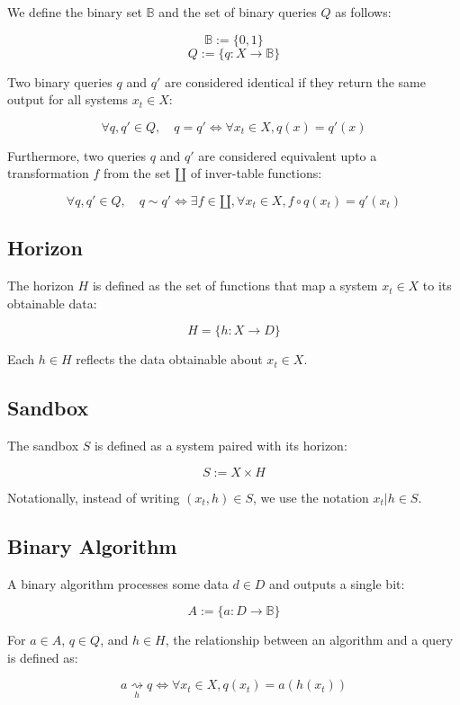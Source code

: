 \documentclass[11pt,a4paper]{article}
\theoremstyle{definition}
\theoremstyle{remark}
\numberwithin{equation}{section}
\begin{document}
We define the binary set $\mathbb{B}$ and the set of binary queries $Q$ as follows:

\[
\mathbb{B} := \{ 0, 1 \}
\]
\[
Q := \{ q : X \rightarrow \mathbb{B} \}
\]

Two binary queries $q$ and $q'$ are considered identical if they return the same output for all systems $x_t \in X$:

\[
\forall q, q' \in Q, \quad q = q' \iff \forall x_t \in X, q(x) = q'(x)
\]

Furthermore, two queries $q$ and $q'$ are considered equivalent upto a transformation $f$ from the set $\amalg$ of inver-table functions:

\[
\forall q, q' \in Q, \quad q \sim q' \iff \exists f \in \amalg, \forall x_t \in X, f \circ q(x_t) = q'(x_t)
\]

\subsection{Horizon}

The horizon $H$ is defined as the set of functions that map a system $x_t \in X$ to its obtainable data:

\[
H = \{ h : X \rightarrow D \}
\]

Each $h \in H$ reflects the data obtainable about $x_t \in X$.

\subsection{Sandbox}

The sandbox $S$ is defined as a system paired with its horizon:

\[
S := X \times H
\]

Notationally, instead of writing $(x_t, h) \in S$, we use the notation $x_t | h \in S$.

\subsection{Binary Algorithm}

A binary algorithm processes some data $d \in D$ and outputs a single bit:

\[
A := \{ a : D \rightarrow \mathbb{B} \}
\]

For $a \in A$, $q \in Q$, and $h \in H$, the relationship between an algorithm and a query is defined as:

\[
a \underset{h}{\rightsquigarrow} q \iff \forall x_t \in X, q(x_t) = a(h(x_t))
\]
\end{document}
